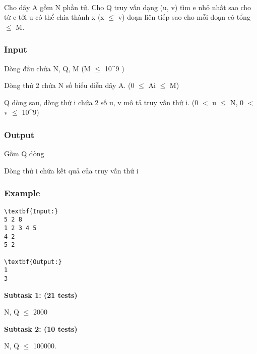 

 

Cho dãy A gồm N phần tử. Cho Q truy vấn dạng (u, v) tìm e nhỏ nhất sao cho từ e tới u có thể chia thành x (x  $\le$  v) đoạn liên tiếp sao cho mỗi đoạn có tổng  $\le$  M.

\subsubsection{Input}

Dòng đầu chứa N, Q, M (M  $\le$  10^9 )

Dòng thứ 2 chứa N số biểu diễn dãy A. (0  $\le$  Ai  $\le$  M)

Q dòng sau, dòng thứ i chứa 2 số u, v mô tả truy vấn thứ i. (0 $<$ u  $\le$  N, 0 $<$ v  $\le$  10^9)

\subsubsection{Output}

Gồm Q dòng

Dòng thứ i chứa kết quả của truy vấn thứ i

\subsubsection{Example}
\begin{verbatim}
\textbf{Input:}
5 2 8
1 2 3 4 5
4 2
5 2

\textbf{Output:}
1
3\end{verbatim}

\textbf{Subtask 1: (21 tests) }

N, Q  $\le$  2000

\textbf{Subtask 2: (10 tests) }

N, Q  $\le$  100000.

 
